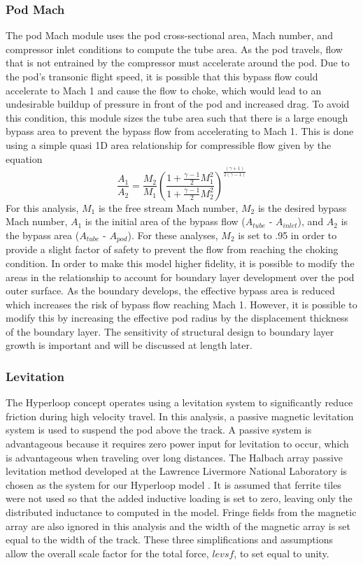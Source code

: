 \subsubsection{Pod Mach}
	The pod Mach module uses the pod cross-sectional area, Mach number, and
	compressor inlet conditions to compute the tube area. As the pod travels,
	flow that is not entrained by the compressor must accelerate around the pod.
	Due to the pod’s transonic flight speed, it is possible that this bypass
	flow could accelerate to Mach 1 and cause the flow to choke, which would
	lead to an undesirable buildup of pressure in front of the pod and
	increased drag. To avoid this condition, this module sizes the tube area
	such that there is a large enough bypass area to prevent the bypass flow
	from accelerating to Mach 1. This is done using a simple quasi 1D area
	relationship for compressible flow given by the equation
	\begin{equation}
		\label{eq:mach_to_area}
		\frac{A_{1}}{A_{2}}=\frac{M_{2}}{M_{1}} \left( \frac{1+\frac{\gamma -1}{2}M_{1}^{2}}{1+\frac{\gamma -1}{2}M_{2}^{2}} \right)^{\frac{( \gamma +1 )}{2 ( \gamma -1  )}}
	\end{equation}
	For this analysis, $M_1$ is the free stream Mach number, $M_2$ is the
	desired bypass Mach number, $A_1$ is the initial area of the bypass flow
	($A_{tube}$ - $A_{inlet}$), and $A_2$ is the bypass area ($A_{tube}$ - $A_{pod}$).
	For these analyses, $M_2$ is set to .95 in order to provide a slight factor
	of safety to prevent the flow from reaching the choking condition.
	In order to make this model higher fidelity, it is possible to modify the
	areas in the relationship to account for boundary layer development over
	the pod outer surface. As the boundary develops, the effective bypass area
	is reduced which increases the risk of bypass flow reaching Mach 1. However,
	it is possible to modify this by increasing the effective pod radius by the
	displacement thickness of the boundary layer. The sensitivity of structural
	design to boundary layer growth is important and will be discussed at length later.
\subsubsection{Levitation}

	The Hyperloop concept operates using a levitation system to significantly
	reduce friction during high velocity travel. In this analysis, a
	passive magnetic levitation system is used to suspend the pod above the
	track. A passive system is advantageous because it requires
	zero power input for levitation to occur, which is advantageous when
	traveling over long distances. The Halbach array passive levitation method
	developed at the Lawrence Livermore National Laboratory is chosen as the
	system for our Hyperloop model \cite{inductrack}. It is assumed that
	ferrite tiles were not used so that the added inductive loading is set to
	zero, leaving only the distributed inductance to computed in the model.
	Fringe fields from the magnetic array are also ignored in this analysis and
	the width of the magnetic array is set equal to the width of the track.
	These three simplifications and assumptions allow the overall scale factor
	for the total force, $levsf$, to set equal to unity.

